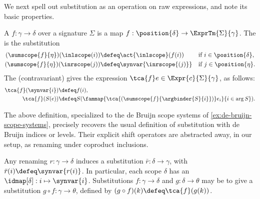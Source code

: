 We next spell out substitution as an operation on raw expressions, and note its basic properties.

\begin{definition}
  \label{def:raw-substitution}%
  A  $f : \gamma \to \delta$ over a signature $\Sigma$ is a map $f : \position{\delta} \to \ExprTm{\Sigma}{\gamma}$.
%
The  is the substitution
%
\begin{align*}
  (\sumscope{f}{\eta})(\inlscope(i)) &\defeq \act{{\inlscope}}(f(i)) & &\text{if $i \in \position{\delta}$}, \\
  (\sumscope{f}{\eta})(\inrscope(j)) &\defeq \synvar{\inrscope{(j)}} & &\text{if $j \in \position{\eta}$}.
\end{align*}
%
The (contravariant)  gives the expression $\tca{f} e \in \Expr{c}{\Sigma}{\gamma}$, as follows:
%
\label{def:raw-substitution-action}
\begin{align*}
  \tca{f} (\synvar{i}) &\defeq f(i), \\
  \tca{f} (S (e)) &\defeq S(\fammap{\tca{(\sumscope{f}{\argbinder{S}{i}})} e_i}{i \in \arg S}).
\end{align*}
\end{definition}

\begin{example}
  \label{ex:de-bruijn-substitution}%
  The above definition, specialized to the de Bruijn scope systems of \cref{ex:de-bruijn-scope-systems}, precisely recovers the usual definition of substitution with de Bruijn indices or levels.
  Their explicit shift operators are abstracted away, in our setup, as renaming under coproduct inclusions.
\end{example}

\begin{definition}
  \label{def:variable-renaming}
  Any renaming $r : \gamma \to \delta$ induces a substitution $\bar{r} : \delta \to \gamma$, with $\bar{r}(i) \defeq \synvar{r(i)}$.
  In particular, each scope $\delta$ has an  $\idmap[\delta] : i \mapsto \synvar{i}$.
  Substitutions $f : \gamma \to \delta$ and $g : \delta \to \theta$ may be  to give a substitution $g \circ f : \gamma \to \theta$, defined by $(g \circ f)(k) \defeq \tca{f}(g(k))$.
\end{definition}


